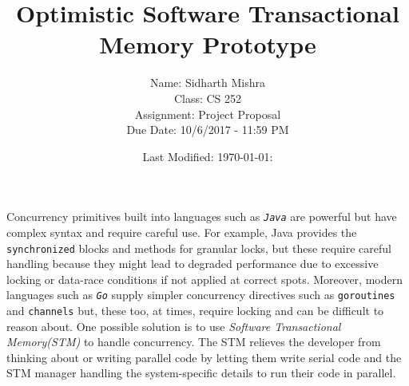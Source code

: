 \documentclass{article}
\title{Optimistic Software Transactional Memory Prototype}
\author {
  Name: Sidharth Mishra \\
  Class: CS 252 \\
  Assignment: Project Proposal \\
  Due Date: 10/6/2017 - 11:59 PM \\
}
\date{Last Modified: {\today}:{\currenttime}}
\begin{document}
    \maketitle

    \begin{flushleft}
    {
      Concurrency primitives built into languages such as \emph{{\tt Java}} are powerful but have complex syntax and require careful use. For example, Java provides the {\tt synchronized} blocks and methods for granular locks, but these require careful handling because they might lead to degraded performance due to excessive locking or data-race conditions if not applied at correct spots. Moreover, modern languages such as \emph{{\tt Go}} supply simpler concurrency directives such as {\tt goroutines} and {\tt channels} but, these too, at times, require locking and can be difficult to reason about. One possible solution is to use \emph{Software Transactional Memory(STM)} to handle concurrency. The STM relieves the developer from thinking about or writing parallel code by letting them write serial code and the STM manager handling the system-specific details to run their code in parallel.
    }  
    \end{flushleft}
\end{document}
